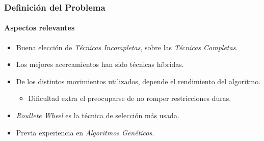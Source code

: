 \frame
{
\frametitle{Definición del Problema}
\framesubtitle{Aspectos relevantes}
\begin{itemize}
	\item Buena elección de \emph{Técnicas Incompletas}, sobre las \emph{Técnicas Completas}. 
	\item Los mejores acercamientos han sido técnicas híbridas.
	\item De los distintos movimientos utilizados, depende el rendimiento del algoritmo.
	\begin{itemize}
		\item Dificultad extra el preocuparse de no romper restricciones duras.
	\end{itemize}
	\item \emph{Roullete Wheel} es la técnica de selección más usada.
	\item Previa experiencia en \emph{Algoritmos Genéticos}.
\end{itemize}
}
